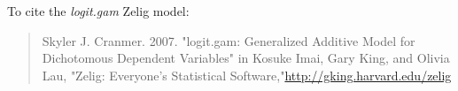 To cite the \emph{ logit.gam } Zelig model:
 \begin{verse}
 Skyler J. Cranmer. 2007. "logit.gam: Generalized Additive Model for Dichotomous Dependent Variables" in Kosuke Imai, Gary King, and Olivia Lau, "Zelig: Everyone's Statistical Software,"\url{http://gking.harvard.edu/zelig} 
\end{verse}